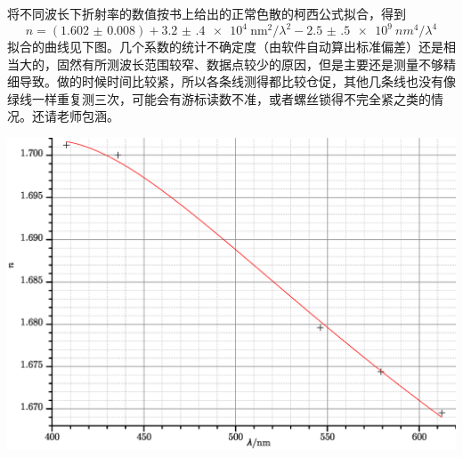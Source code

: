 \documentclass[UTF8]{ctexart}
\begin{document}
将不同波长下折射率的数值按书上给出的正常色散的柯西公式拟合，得到
\[n=(\num{1.602(8)})+\SI{3.2(4)e4}{\nm\squared}/\lambda^2-\SI{2.5(5)e9}{nm^4}/\lambda^4\]
拟合的曲线见下图。几个系数的统计不确定度（由软件自动算出标准偏差）还是相当大的，固然有所测波长范围较窄、数据点较少的原因，但是主要还是测量不够精细导致。做的时候时间比较紧，所以各条线测得都比较仓促，其他几条线也没有像绿线一样重复测三次，可能会有游标读数不准，或者螺丝锁得不完全紧之类的情况。还请老师包涵。
\begin{center}
	\includegraphics[width=0.9\linewidth,keepaspectratio=true]{Dispersion.eps}
\end{center}
\end{document}
